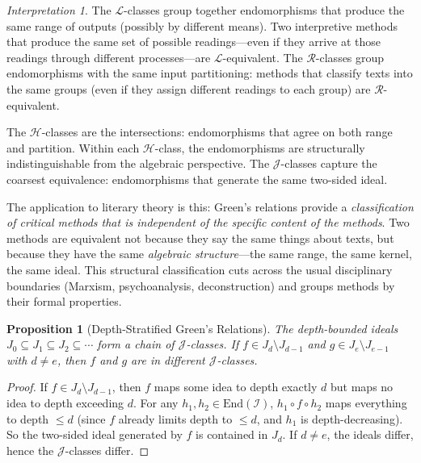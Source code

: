 \documentclass[11pt,openany]{book}
\theoremstyle{definition}
\theoremstyle{plain}
\newtheorem{proposition}[axiom]{Proposition}
\theoremstyle{remark}
\newtheorem{interpretation}[axiom]{Interpretation}
\newcommand{\IS}{\mathcal{I}}               %
\begin{document}
\begin{interpretation}
The $\mathcal{L}$-classes group together endomorphisms that produce the same range of outputs (possibly by different means). Two interpretive methods that produce the same set of possible readings---even if they arrive at those readings through different processes---are $\mathcal{L}$-equivalent. The $\mathcal{R}$-classes group endomorphisms with the same input partitioning: methods that classify texts into the same groups (even if they assign different readings to each group) are $\mathcal{R}$-equivalent.

The $\mathcal{H}$-classes are the intersections: endomorphisms that agree on both range and partition. Within each $\mathcal{H}$-class, the endomorphisms are structurally indistinguishable from the algebraic perspective. The $\mathcal{J}$-classes capture the coarsest equivalence: endomorphisms that generate the same two-sided ideal.

The application to literary theory is this: Green's relations provide a \emph{classification of critical methods that is independent of the specific content of the methods}. Two methods are equivalent not because they say the same things about texts, but because they have the same \emph{algebraic structure}---the same range, the same kernel, the same ideal. This structural classification cuts across the usual disciplinary boundaries (Marxism, psychoanalysis, deconstruction) and groups methods by their formal properties.
\end{interpretation}

\begin{proposition}[Depth-Stratified Green's Relations]
The depth-bounded ideals $J_0 \subseteq J_1 \subseteq J_2 \subseteq \cdots$ form a chain of $\mathcal{J}$-classes. If $f \in J_d \setminus J_{d-1}$ and $g \in J_e \setminus J_{e-1}$ with $d \neq e$, then $f$ and $g$ are in different $\mathcal{J}$-classes.
\end{proposition}

\begin{proof}
If $f \in J_d \setminus J_{d-1}$, then $f$ maps some idea to depth exactly $d$ but maps no idea to depth exceeding $d$. For any $h_1, h_2 \in \mathrm{End}(\IS)$, $h_1 \circ f \circ h_2$ maps everything to depth $\leq d$ (since $f$ already limits depth to $\leq d$, and $h_1$ is depth-decreasing). So the two-sided ideal generated by $f$ is contained in $J_d$. If $d \neq e$, the ideals differ, hence the $\mathcal{J}$-classes differ.
\end{proof}
\end{document}
